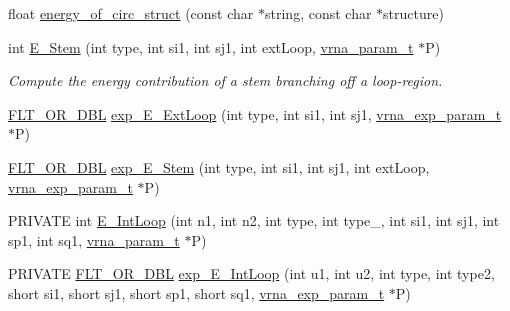 \begin{DoxyCompactItemize}
\item 
float \mbox{\hyperlink{group__eval__deprecated_ga657222e2758c46bf13b416ef3032e417}{energy\+\_\+of\+\_\+circ\+\_\+struct}} (const char $\ast$string, const char $\ast$structure)
\item 
int \mbox{\hyperlink{group__eval__deprecated_ga51f9851f3500c2aae66674142a6a2dd5}{E\+\_\+\+Stem}} (int type, int si1, int sj1, int ext\+Loop, \mbox{\hyperlink{group__energy__parameters_ga8a69ca7d787e4fd6079914f5343a1f35}{vrna\+\_\+param\+\_\+t}} $\ast$P)
\begin{DoxyCompactList}\small\item\em Compute the energy contribution of a stem branching off a loop-\/region. \end{DoxyCompactList}\item 
\mbox{\hyperlink{group__data__structures_ga31125aeace516926bf7f251f759b6126}{F\+L\+T\+\_\+\+O\+R\+\_\+\+D\+BL}} \mbox{\hyperlink{group__eval__deprecated_ga446828a191c127861e76e2c84055f672}{exp\+\_\+\+E\+\_\+\+Ext\+Loop}} (int type, int si1, int sj1, \mbox{\hyperlink{group__energy__parameters_ga01d8b92fe734df8d79a6169482c7d8d8}{vrna\+\_\+exp\+\_\+param\+\_\+t}} $\ast$P)
\item 
\mbox{\hyperlink{group__data__structures_ga31125aeace516926bf7f251f759b6126}{F\+L\+T\+\_\+\+O\+R\+\_\+\+D\+BL}} \mbox{\hyperlink{group__eval__deprecated_gab0aa9833ab41875a91a9be8a5ffd7092}{exp\+\_\+\+E\+\_\+\+Stem}} (int type, int si1, int sj1, int ext\+Loop, \mbox{\hyperlink{group__energy__parameters_ga01d8b92fe734df8d79a6169482c7d8d8}{vrna\+\_\+exp\+\_\+param\+\_\+t}} $\ast$P)
\item 
P\+R\+I\+V\+A\+TE int \mbox{\hyperlink{group__eval__deprecated_gaafbc187b7f78e8e82afb77dd6f3b8fc5}{E\+\_\+\+Int\+Loop}} (int n1, int n2, int type, int type\+\_, int si1, int sj1, int sp1, int sq1, \mbox{\hyperlink{group__energy__parameters_ga8a69ca7d787e4fd6079914f5343a1f35}{vrna\+\_\+param\+\_\+t}} $\ast$P)
\item 
P\+R\+I\+V\+A\+TE \mbox{\hyperlink{group__data__structures_ga31125aeace516926bf7f251f759b6126}{F\+L\+T\+\_\+\+O\+R\+\_\+\+D\+BL}} \mbox{\hyperlink{group__eval__deprecated_ga95de54d8a2a17645a95e0f34e189d9c9}{exp\+\_\+\+E\+\_\+\+Int\+Loop}} (int u1, int u2, int type, int type2, short si1, short sj1, short sp1, short sq1, \mbox{\hyperlink{group__energy__parameters_ga01d8b92fe734df8d79a6169482c7d8d8}{vrna\+\_\+exp\+\_\+param\+\_\+t}} $\ast$P)
\end{DoxyCompactItemize}
